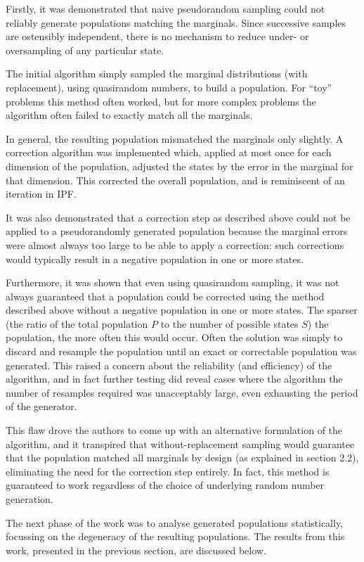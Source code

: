 \documentclass[]{article}
\begin{document}
Firstly, it was demonstrated that naive pseudorandom sampling could not
reliably generate populations matching the marginals. Since successive
samples are ostensibly independent, there is no mechanism to reduce
under- or oversampling of any particular state.

The initial algorithm simply sampled the marginal distributions (with
replacement), using quasirandom numbers, to build a population. For
``toy'' problems this method often worked, but for more complex problems
the algorithm often failed to exactly match all the marginals.

In general, the resulting population mismatched the marginals only
slightly. A correction algorithm was implemented which, applied at most
once for each dimension of the population, adjusted the states by the
error in the marginal for that dimension. This corrected the overall
population, and is reminiscent of an iteration in IPF.

It was also demonstrated that a correction step as described above could
not be applied to a pseudorandomly generated population because the
marginal errors were almost always too large to be able to apply a
correction: such corrections would typically result in a negative
population in one or more states.

Furthermore, it was shown that even using quasirandom sampling, it was
not always guaranteed that a population could be corrected using the
method described above without a negative population in one or more
states. The sparser (the ratio of the total population \(P\) to the
number of possible states \(S\)) the population, the more often this
would occur. Often the solution was simply to discard and resample the
population until an exact or correctable population was generated. This
raised a concern about the reliability (and efficiency) of the
algorithm, and in fact further testing did reveal cases where the
algorithm the number of resamples required was unacceptably large, even
exhausting the period of the generator.

This flaw drove the authors to come up with an alternative formulation
of the algorithm, and it transpired that without-replacement sampling
would guarantee that the population matched all marginals by design (as
explained in section 2.2), eliminating the need for the correction step
entirely. In fact, this method is guaranteed to work regardless of the
choice of underlying random number generation.

The next phase of the work was to analyse generated populations
statistically, focussing on the degeneracy of the resulting populations.
The results from this work, presented in the previous section, are
discussed below.
\end{document}
